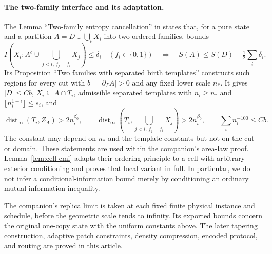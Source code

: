 \documentclass[11pt]{article}
\numberwithin{equation}{section}
\theoremstyle{definition}
\theoremstyle{remark}
\DeclareMathOperator{\dist}{dist}
\begin{document}
\paragraph{The two-family interface and its adaptation.}
The Lemma ``Two-family entropy cancellation'' in
\cite[Section~11]{RepoAreaLaw} states that, for a pure state and a partition
$A=D\mathbin{\dot\cup}\bigcup_iX_i$ into two ordered families, bounds
\[
 I\left(X_i:A^c\cup\bigcup_{j<i,\,f_j=f_i}X_j\right)\le\delta_i
 \quad(f_i\in\{0,1\})
 \quad\Longrightarrow\quad
 S(A)\le S(D)+\tfrac12\sum_i\delta_i.
\]
Its Proposition ``Two families with separated birth templates'' constructs
such regions for every cut with $b=|\partial_\Gamma A|>0$ and any fixed lower
scale $n_*$. It gives $|D|\le Cb$, $X_i\subseteq A\cap T_i$, admissible
separated templates with $n_i\ge n_*$ and
$\lfloor n_i^{1-\epsilon}\rfloor\le s_i$, and
\[
 \dist_\infty(T_i,Z_A)>2n_i^{\beta_0},\qquad
 \dist_\infty\left(T_i,\bigcup_{j<i,\,f_j=f_i}X_j\right)>2n_i^{\beta_0},
 \qquad \sum_i n_i^{-100}\le Cb.
\]
The constant may depend on $n_*$ and the template constants but not on the
cut or domain. These statements are used within the companion's area-law
proof. Lemma~\ref{lem:cell-cmi} adapts their ordering principle to a cell
with arbitrary exterior conditioning and proves that local variant in
full. In particular, we do not infer a conditional-information bound merely
by conditioning an ordinary mutual-information inequality.

The companion's replica limit is taken at each fixed finite physical
instance and schedule, before the geometric scale tends to infinity.
Its exported bounds concern the original one-copy state with the uniform
constants above. The later tapering construction, adaptive patch
constraints, density compression, encoded protocol, and routing are proved
in this article.

\begingroup
\small
\let\originalthebibliography\thebibliography
\renewcommand{\thebibliography}[1]{
  \originalthebibliography{#1}
  \addcontentsline{toc}{section}{\refname}
}


\endgroup
\end{document}
